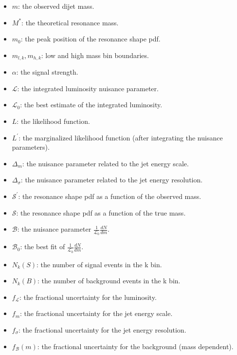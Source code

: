     \begin{itemize}
     \item $m$: the observed dijet mass.
     \item $M^*$: the theoretical resonance mass.
     \item $m_0$: the peak position of the resonance shape pdf.
     \item $m_{l,k},m_{h,k}$: low and high mass bin boundaries.
     \item $\alpha$: the signal strength.
     \item $\mathcal{L}$: the integrated luminosity nuisance parameter.
     \item $\mathcal{L}_0$: the best estimate of the integrated luminosity.
     \item $L$: the likelihood function.
     \item $L^\prime$: the marginalized likelihood function (after integrating the nuisance parameters).
     \item $\Delta_m$: the nuisance parameter related to the jet energy scale.
     \item $\Delta_\sigma$: the nuisance parameter related to the jet energy resolution.
     \item $\mathcal{S}^\prime$: the resonance shape pdf as a function of the observed mass. 
     \item $\mathcal{S}$: the resonance shape pdf as a function of the true mass.  
     \item $\mathcal{B}$: the nuisance parameter $\frac{1}{\mathcal{L}_0}\frac{dN}{dm}$.
     \item $\mathcal{B}_0$: the best fit of $\frac{1}{\mathcal{L}_0}\frac{dN}{dm}$.
     \item $N_k(S)$: the number of signal events in the k bin.
     \item $N_k(B)$: the number of background events in the k bin.
     \item $f_\mathcal{L}$: the fractional uncertainty for the luminosity.
     \item $f_m$: the fractional uncertainty for the jet energy scale.
     \item $f_\sigma$: the fractional uncertainty for the jet energy resolution.
     \item $f_\mathcal{B}(m)$: the fractional uncertainty for the background (mass dependent).
    \end{itemize}

